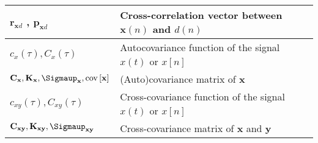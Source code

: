 \begin{xltabular}{\textwidth}{XX}
	\(\mathbf{r}_{\mathbf{x}d}\) \cite{haykinNeuralNetworksLearning2009}, \(\mathbf{p}_{\mathbf{x}d}\) \cite{dinizAdaptiveFilteringAlgorithms2002} & Cross-correlation vector between \(\mathbf{x}(n)\) and \(d(n)\)                                                                                                                                                                    \\ \hline
	\(c_x(\tau), C_x(\tau)\)                                                                                                                       & Autocovariance function of the signal \(x(t)\) or \(x[n]\) \cite{nossekAdaptiveArraySignal2015}                                                                                                                                    \\ \hline
	\(\mathbf{C}_\mathbf{x}, \mathbf{K}_\mathbf{x}, \boldsymbol{\Sigmaup}_\mathbf{x}, \textnormal{cov}\left[ \mathbf{x} \right]\)                  & (Auto)covariance matrix of \(\mathbf{x}\) \cite{vantreesOptimumArrayProcessing2002,proakisDigitalCommunications2007,leon-garciaProbabilityStatisticsRandom2007,haykinAdaptiveFilterTheory2002,bishopPatternRecognitionMachine2006} \\ \hline
	\(c_{xy}(\tau), C_{xy}(\tau)\)                                                                                                                 & Cross-covariance function of the signal \(x(t)\) or \(x[n]\) \cite{nossekAdaptiveArraySignal2015}                                                                                                                                  \\ \hline
	\(\mathbf{C}_{\mathbf{xy}}, \mathbf{K}_{\mathbf{xy}}, \boldsymbol{\Sigmaup}_{\mathbf{xy}}\)                                                    & Cross-covariance matrix of \(\mathbf{x}\) and \(\mathbf{y}\)
\end{xltabular}


